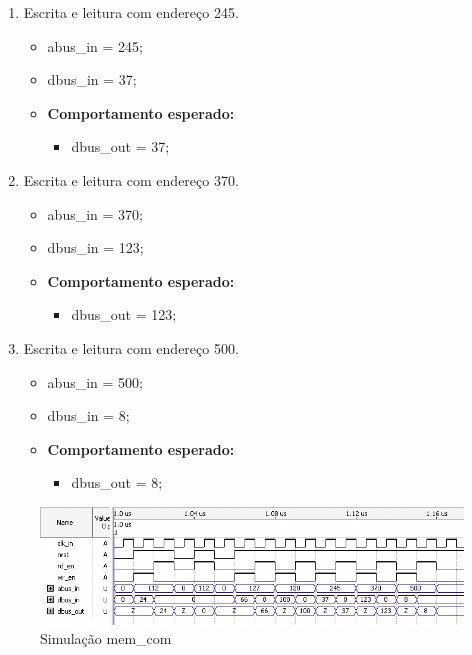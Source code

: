 \documentclass{article}
\begin{document}
\begin{enumerate}
    \item  Escrita e leitura com endereço 245.
    \begin{itemize}
        \item abus\_in = 245;
        \item dbus\_in = 37;
        \item \textbf{Comportamento esperado:}
        \begin{itemize}
            \item dbus\_out = 37;
        \end{itemize}
    \end{itemize}

    \item  Escrita e leitura com endereço 370.
    \begin{itemize}
        \item abus\_in = 370;
        \item dbus\_in = 123;
        \item \textbf{Comportamento esperado:}
        \begin{itemize}
            \item dbus\_out = 123;
        \end{itemize}
    \end{itemize}

    \item  Escrita e leitura com endereço 500.
    \begin{itemize}
        \item abus\_in = 500;
        \item dbus\_in = 8;
        \item \textbf{Comportamento esperado:}
        \begin{itemize}
            \item dbus\_out = 8;
        \end{itemize}
    \end{itemize}
\end{enumerate}

\begin{figure}[ht]
\begin{center}
    \includegraphics[width=15cm]{images/ram-mem-com.png}
    \caption{Simulação mem\_com}
\end{center}
\end{figure}
\end{document}

